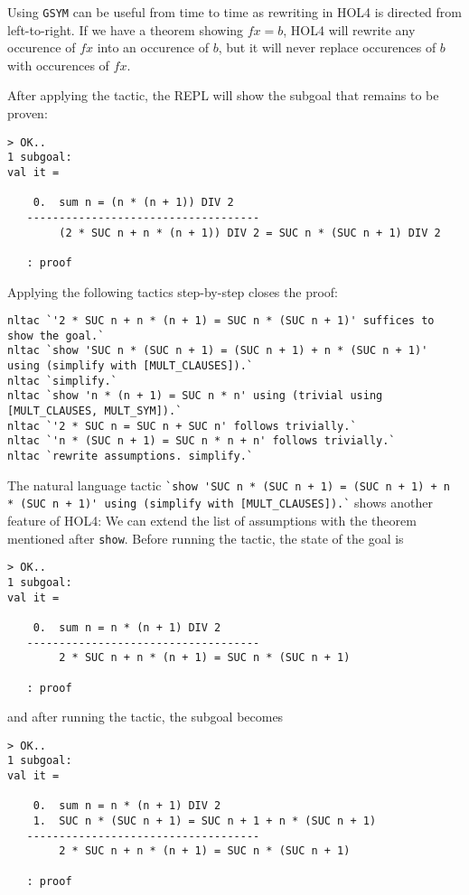 Using \lstinline{GSYM} can be useful from time to time as rewriting in HOL4 is
directed from left-to-right.
If we have a theorem showing $f x = b$, HOL4 will rewrite any occurence of
$f x$ into an occurence of $b$, but it will never replace occurences of $b$
with occurences of $f x$.

After applying the tactic, the REPL will show the subgoal that remains to be proven:
\begin{lstlisting}
> OK..
1 subgoal:
val it =

    0.  sum n = (n * (n + 1)) DIV 2
   ------------------------------------
        (2 * SUC n + n * (n + 1)) DIV 2 = SUC n * (SUC n + 1) DIV 2

   : proof
\end{lstlisting}

Applying the following tactics step-by-step closes the proof:

\begin{lstlisting}
nltac `'2 * SUC n + n * (n + 1) = SUC n * (SUC n + 1)' suffices to show the goal.`
nltac `show 'SUC n * (SUC n + 1) = (SUC n + 1) + n * (SUC n + 1)' using (simplify with [MULT_CLAUSES]).`
nltac `simplify.`
nltac `show 'n * (n + 1) = SUC n * n' using (trivial using [MULT_CLAUSES, MULT_SYM]).`
nltac `'2 * SUC n = SUC n + SUC n' follows trivially.`
nltac `'n * (SUC n + 1) = SUC n * n + n' follows trivially.`
nltac `rewrite assumptions. simplify.`
\end{lstlisting}

\begin{sloppypar}
The natural language tactic \lstinline{`show 'SUC n * (SUC n + 1) = (SUC n + 1) + n * (SUC n + 1)' using (simplify with [MULT_CLAUSES]).`}
shows another feature of HOL4:
We can extend the list of assumptions with the theorem mentioned after
\lstinline{show}.
Before running the tactic, the state of the goal is
\end{sloppypar}
\begin{lstlisting}
> OK..
1 subgoal:
val it =

    0.  sum n = n * (n + 1) DIV 2
   ------------------------------------
        2 * SUC n + n * (n + 1) = SUC n * (SUC n + 1)

   : proof
\end{lstlisting}

and after running the tactic, the subgoal becomes
\begin{lstlisting}
> OK..
1 subgoal:
val it =

    0.  sum n = n * (n + 1) DIV 2
    1.  SUC n * (SUC n + 1) = SUC n + 1 + n * (SUC n + 1)
   ------------------------------------
        2 * SUC n + n * (n + 1) = SUC n * (SUC n + 1)

   : proof
\end{lstlisting}

